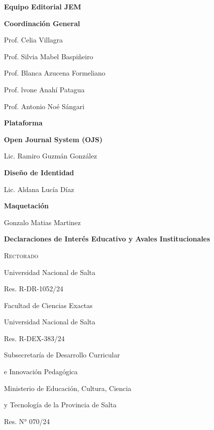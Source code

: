 \begin{center}
	\LARGE \bfseries \sffamily Equipo Editorial JEM
\end{center}

\begin{center}
	\sffamily \Large \bfseries Coordinación General
	
	\bigskip
	
	\normalfont \large
	Prof. Celia Villagra
	
	Prof. Silvia Mabel Baspiñeiro
	
	Prof. Blanca Azucena Formeliano
	
	Prof. lvone Anahí Patagua
	
	Prof. Antonio Noé Sángari
\end{center}

\vspace*{2.5mm}

\begin{center}
	\sffamily \Large \bfseries Plataforma
	
	\bigskip
	
	\sffamily \large \bfseries Open Journal System (OJS)
	
	\normalfont \large
	Lic. Ramiro Guzmán González
	
	\bigskip
	
	\sffamily \large \bfseries Diseño de Identidad
	
	\normalfont \large
	Lic. Aldana Lucía Díaz
	
	\bigskip
	
	\sffamily \large \bfseries Maquetación 
	
	\normalfont \large
	Gonzalo Matias Martinez
\end{center}

\vspace*{5mm}

\begin{center}
	\sffamily \Large \bfseries Declaraciones de Interés Educativo y Avales Institucionales
	
	\bigskip
	
	\normalfont \normalsize \scshape
	Rectorado
	
	Universidad Nacional de Salta
	
	Res. R-DR-1052/24
	
	\vspace{1.5em}
	
	Facultad de Ciencias Exactas 
	
	Universidad Nacional de Salta
	
	Res. R-DEX-383/24
	
	\vspace{1.5em}
	
	Subsecretaría de Desarrollo Curricular
	
	e Innovación Pedagógica
	
	Ministerio de Educación, Cultura, Ciencia 
	
	y Tecnología de la Provincia de Salta
	
	Res. N° 070/24
	
\end{center}